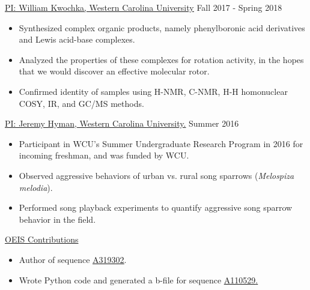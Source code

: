 \href{https://www.wcu.edu/learn/departments-schools-colleges/cas/science-and-math/chemphys/faculty-and-staff/william-r.-kwochka.aspx}{\ul{PI: William Kwochka, Western Carolina University}} \hfill Fall 2017 - Spring 2018
\begin{itemize}[noitemsep]
\item Synthesized complex organic products, namely phenylboronic acid derivatives and Lewis acid-base complexes.
\item Analyzed the properties of these complexes for rotation activity, in the hopes that we would discover an effective molecular rotor.
\item Confirmed identity of samples using H-NMR, C-NMR, H-H homonuclear COSY, IR, and GC/MS methods.
\end{itemize}

\href{https://www.wcu.edu/learn/departments-schools-colleges/cas/science-and-math/biology/biology-faculty-staff/jeremy-hyman.aspx}{\ul{PI: Jeremy Hyman, Western Carolina University.}} \hfill Summer 2016
\begin{itemize}[noitemsep]
\item Participant in WCU's Summer Undergraduate Research Program in 2016 for incoming freshman, and was funded by WCU.
\item Observed aggressive behaviors of urban vs. rural song sparrows ({\it Melospiza melodia}).
\item Performed song playback experiments to quantify aggressive song sparrow behavior in the field.
\end{itemize}

\ul{OEIS Contributions}
\begin{itemize}[noitemsep]
\item Author of sequence \href{https://oeis.org/A319302}{\ul{A319302}}.
\item Wrote Python code and generated a b-file for sequence \href{https://oeis.org/A110529}{\ul{A110529}.}
\end{itemize}